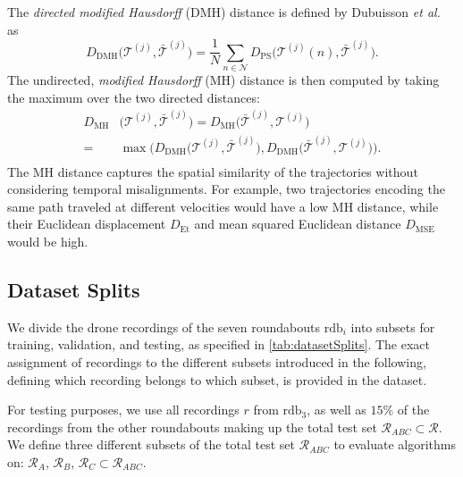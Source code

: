 \documentclass[a4paper, 10pt, conference]{ieeeconf}      %
\begin{document}
The \textit{directed modified Hausdorff} (DMH) distance is defined by Dubuisson \textit{et al.}~\cite{dubuisson_modified_1994} as
\begin{equation}
  D_{\mathrm{DMH}}\Big(\mathcal T^{(j)}, \bar{\mathcal T}^{(j)}\Big) = \frac{1}{N}\sum\limits_{n \in \mathcal N} D_{\mathrm{PS}}\Big(\mathcal T^{(j)}(n), \bar{\mathcal T}^{(j)}\Big).
\end{equation}
The undirected, \textit{modified Hausdorff} (MH) distance is then computed by taking the maximum over the two directed distances:
\begin{equation} \label{eq:undirectedModifiedHausdorffDistance}
   \begin{split}
   D_{\mathrm{MH}}&\Big(\mathcal T^{(j)}, \bar{\mathcal T}^{(j)}\Big) = D_{\mathrm{MH}}\Big(\bar{\mathcal T}^{(j)}, \mathcal T^{(j)}\Big) \\
   = & \max\bigg(D_{\mathrm{DMH}}\Big(\mathcal T^{(j)}, \bar{\mathcal T}^{(j)}\Big), D_{\mathrm{DMH}}\Big(\bar{\mathcal T}^{(j)}, \mathcal T^{(j)}\Big)\bigg). \\
   \end{split}
\end{equation}
The \gls{MH} distance captures the spatial similarity of the trajectories without considering temporal misalignments.
For example, two trajectories encoding the same path traveled at different velocities would have a low \gls{MH} distance, while their Euclidean displacement $D_{\mathrm{Et}}$ and mean squared Euclidean distance $D_{\mathrm{MSE}}$ would be high.



\subsection{Dataset Splits} \label{sec:datasetSplit}
We divide the drone recordings of the seven roundabouts $\text{rdb}_i$ into subsets for training, validation, and testing, as specified in \autoref{tab:datasetSplits}.
The exact assignment of recordings to the different subsets introduced in the following, defining which recording belongs to which subset, is provided in the dataset.

For testing purposes, we use all recordings $r$ from $\text{rdb}_3$, as well as $15\%$ of the recordings from the other roundabouts making up the total test set $\mathcal R_{ABC} \subset \mathcal R$.
We define three different subsets of the total test set $\mathcal R_{ABC}$ to evaluate algorithms on: $\mathcal{R}_A$, $\mathcal{R}_B$, $\mathcal{R}_C \subset \mathcal{R}_{ABC}$.
\end{document}
